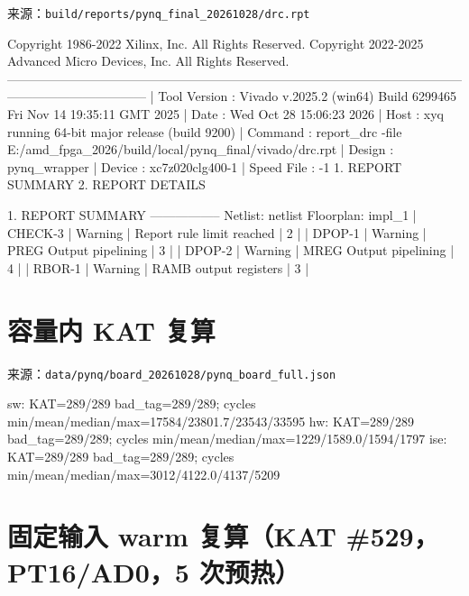 来源：\texttt{build/\allowbreak{}reports/\allowbreak{}pynq\_\allowbreak{}final\_\allowbreak{}20261028/\allowbreak{}drc.\allowbreak{}rpt}

\begin{codeblock}
Copyright 1986-2022 Xilinx, Inc. All Rights Reserved. Copyright 2022-2025 Advanced Micro Devices, Inc. All Rights Reserved.
---------------------------------------------------------------------------------------------------------------------------------------------
| Tool Version : Vivado v.2025.2 (win64) Build 6299465 Fri Nov 14 19:35:11 GMT 2025
| Date         : Wed Oct 28 15:06:23 2026
| Host         : xyq running 64-bit major release  (build 9200)
| Command      : report_drc -file E:/amd_fpga_2026/build/local/pynq_final/vivado/drc.rpt
| Design       : pynq_wrapper
| Device       : xc7z020clg400-1
| Speed File   : -1
1. REPORT SUMMARY
2. REPORT DETAILS

1. REPORT SUMMARY
-----------------
            Netlist: netlist
          Floorplan: impl_1
| CHECK-3   | Warning  | Report rule limit reached  | 2      |
| DPOP-1    | Warning  | PREG Output pipelining     | 3      |
| DPOP-2    | Warning  | MREG Output pipelining     | 4      |
| RBOR-1    | Warning  | RAMB output registers      | 3      |
\end{codeblock}

\Needspace{107pt}

\section{容量内 KAT 复算}\label{ux5bb9ux91cfux5185-kat-ux590dux7b97}

来源：\texttt{data/\allowbreak{}pynq/\allowbreak{}board\_\allowbreak{}20261028/\allowbreak{}pynq\_\allowbreak{}board\_\allowbreak{}full.\allowbreak{}json}

\begin{codeblock}[samepage=true]
sw: KAT=289/289 bad_tag=289/289; cycles min/mean/median/max=17584/23801.7/23543/33595
hw: KAT=289/289 bad_tag=289/289; cycles min/mean/median/max=1229/1589.0/1594/1797
ise: KAT=289/289 bad_tag=289/289; cycles min/mean/median/max=3012/4122.0/4137/5209
\end{codeblock}

\Needspace{144pt}

\section{固定输入 warm 复算（KAT \#529，PT16/AD0，5 次预热）}\label{ux56faux5b9aux8f93ux5165-warm-ux590dux7b97kat-529pt16ad05-ux6b21ux9884ux70ed}

